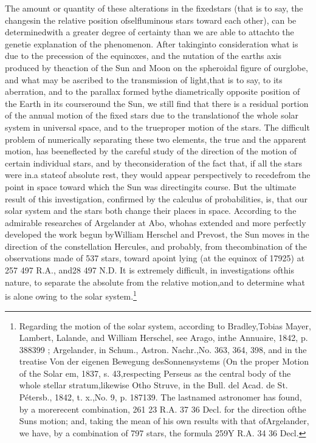 The amount or quantity of these alterations in the fixedstars (that is to say, the changesin the relative position ofselfluminous stars toward each other), can be determinedwith a greater degree of certainty than we are able to attachto the genetie explanation of the phenomenon. After takinginto consideration what is due to the precession of the equinoxes, and the nutation of the earths axis produced by theaction of the Sun and Moon on the spheroidal figure of ourglobe, and what may be ascribed to the transmission of light,that is to say, to its aberration, and to the parallax formed bythe diametrically opposite position of the Earth in its courseround the Sun, we still find that there is a residual portion of the annual motion of the fixed stars due to the translationof the whole solar system in universal space, and to the trueproper motion of the stars. The difficult problem of numerically separating these two elements, the true and the apparent motion, has beeneflected by the careful study of the direction of the motion of certain individual stars, and by theconsideration of the fact that, if all the stars were in.a stateof absolute rest, they would appear perspectively to recedefrom the point in space toward which the Sun was directingits course. But the ultimate result of this investigation, confirmed by the calculus of probabilities, is, that our solar system and the stars both change their places in space. According to the admirable researches of Argelander at Abo, whohas extended and more perfectly developed the work begun byWilliam Herschel and Prevost, the Sun moves in the direction of the constellation Hercules, and probably, from thecombination of the observations made of 537 stars, toward apoint lying (at the equinox of 17925) at 257 497 R.A., and28 497 N.D. It is extremely difficult, in investigations ofthis nature, to separate the absolute from the relative motion,and to determine what is alone owing to the solar system.\footnote{Regarding the motion of the solar system, according to Bradley,Tobias Mayer, Lambert, Lalande, and William Herschel, see Arago, inthe Annuaire, 1842, p. 388399 ; Argelander, in Schum., Astron. Nachr.,No. 363, 364, 398, and in the treatise Von der eigenen Bewegung desSonnensystems (On the proper Motion of the Solar em, 1837, s. 43,respecting Perseus as the central body of the whole stellar stratum,likewise Otho Struve, in the Bull. del Acad. de St. P\'{e}tersb., 1842, t. x.,No. 9, p. 187139. The lastnamed astronomer has found, by a morerecent combination, 261 23 R.A.  37 36 Decl. for the direction ofthe Suns motion; and, taking the mean of his own results with that ofArgelander, we have, by a combination of 797 stars, the formula 259Y R.A.  34 36 Decl.}

